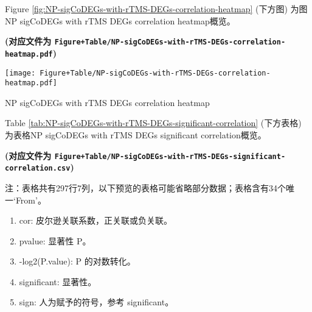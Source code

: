 \documentclass[
]{article}
\providecommand{\tightlist}{%
  \setlength{\itemsep}{0pt}\setlength{\parskip}{0pt}}
\begin{document}
Figure \ref{fig:NP-sigCoDEGs-with-rTMS-DEGs-correlation-heatmap} (下方图) 为图NP sigCoDEGs with rTMS DEGs correlation heatmap概览。

\textbf{(对应文件为 \texttt{Figure+Table/NP-sigCoDEGs-with-rTMS-DEGs-correlation-heatmap.pdf})}

\def\@captype{figure}
\begin{center}
\texttt{[image: Figure+Table/NP-sigCoDEGs-with-rTMS-DEGs-correlation-heatmap.pdf]}
\caption{NP sigCoDEGs with rTMS DEGs correlation heatmap}\label{fig:NP-sigCoDEGs-with-rTMS-DEGs-correlation-heatmap}
\end{center}

Table \ref{tab:NP-sigCoDEGs-with-rTMS-DEGs-significant-correlation} (下方表格) 为表格NP sigCoDEGs with rTMS DEGs significant correlation概览。

\textbf{(对应文件为 \texttt{Figure+Table/NP-sigCoDEGs-with-rTMS-DEGs-significant-correlation.csv})}

\begin{center}\begin{tcolorbox}[colback=gray!10, colframe=gray!50, width=0.9\linewidth, arc=1mm, boxrule=0.5pt]注：表格共有297行7列，以下预览的表格可能省略部分数据；表格含有34个唯一`From'。
\end{tcolorbox}
\end{center}
\begin{center}\begin{tcolorbox}[colback=gray!10, colframe=gray!50, width=0.9\linewidth, arc=1mm, boxrule=0.5pt]\begin{enumerate}\tightlist
\item cor: 皮尔逊关联系数，正关联或负关联。
\item pvalue: 显著性 P。
\item -log2(P.value): P 的对数转化。
\item significant: 显著性。
\item sign: 人为赋予的符号，参考 significant。
\end{enumerate}\end{tcolorbox}
\end{center}
\end{document}
